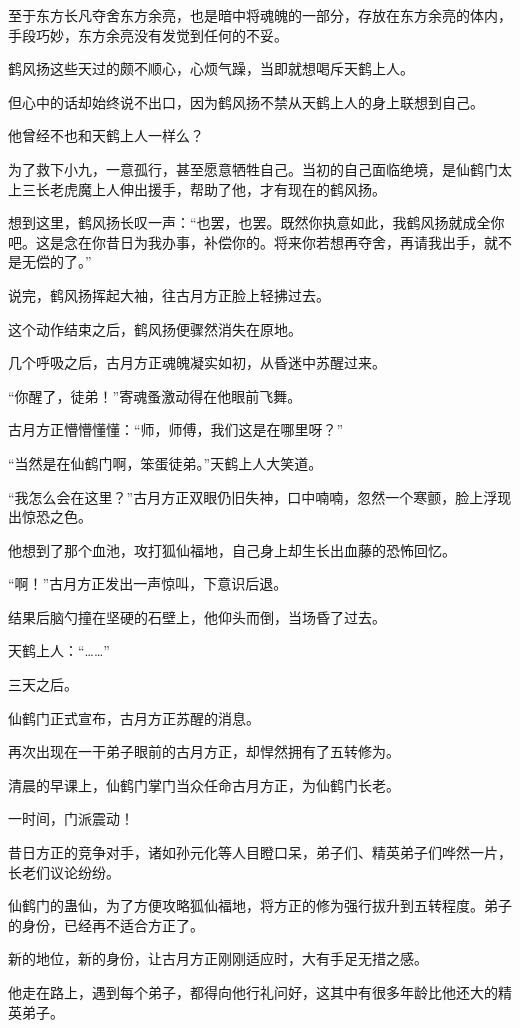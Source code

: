 \begin{this_body}
至于东方长凡夺舍东方余亮，也是暗中将魂魄的一部分，存放在东方余亮的体内，手段巧妙，东方余亮没有发觉到任何的不妥。

鹤风扬这些天过的颇不顺心，心烦气躁，当即就想喝斥天鹤上人。

但心中的话却始终说不出口，因为鹤风扬不禁从天鹤上人的身上联想到自己。

他曾经不也和天鹤上人一样么？

为了救下小九，一意孤行，甚至愿意牺牲自己。当初的自己面临绝境，是仙鹤门太上三长老虎魔上人伸出援手，帮助了他，才有现在的鹤风扬。

想到这里，鹤风扬长叹一声：“也罢，也罢。既然你执意如此，我鹤风扬就成全你吧。这是念在你昔日为我办事，补偿你的。将来你若想再夺舍，再请我出手，就不是无偿的了。”

说完，鹤风扬挥起大袖，往古月方正脸上轻拂过去。

这个动作结束之后，鹤风扬便骤然消失在原地。

几个呼吸之后，古月方正魂魄凝实如初，从昏迷中苏醒过来。

“你醒了，徒弟！”寄魂蚤激动得在他眼前飞舞。

古月方正懵懵懂懂：“师，师傅，我们这是在哪里呀？”

“当然是在仙鹤门啊，笨蛋徒弟。”天鹤上人大笑道。

“我怎么会在这里？”古月方正双眼仍旧失神，口中喃喃，忽然一个寒颤，脸上浮现出惊恐之色。

他想到了那个血池，攻打狐仙福地，自己身上却生长出血藤的恐怖回忆。

“啊！”古月方正发出一声惊叫，下意识后退。

结果后脑勺撞在坚硬的石壁上，他仰头而倒，当场昏了过去。

天鹤上人：“……”

三天之后。

仙鹤门正式宣布，古月方正苏醒的消息。

再次出现在一干弟子眼前的古月方正，却悍然拥有了五转修为。

清晨的早课上，仙鹤门掌门当众任命古月方正，为仙鹤门长老。

一时间，门派震动！

昔日方正的竞争对手，诸如孙元化等人目瞪口呆，弟子们、精英弟子们哗然一片，长老们议论纷纷。

仙鹤门的蛊仙，为了方便攻略狐仙福地，将方正的修为强行拔升到五转程度。弟子的身份，已经再不适合方正了。

新的地位，新的身份，让古月方正刚刚适应时，大有手足无措之感。

他走在路上，遇到每个弟子，都得向他行礼问好，这其中有很多年龄比他还大的精英弟子。


\end{this_body}
